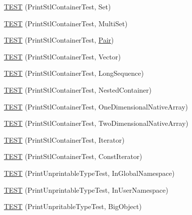 \begin{DoxyCompactItemize}
\item 
\hyperlink{namespacetesting_1_1gtest__printers__test_abdc498462741033074f8e86b7c0bd480}{T\+E\+ST} (Print\+Stl\+Container\+Test, Set)
\item 
\hyperlink{namespacetesting_1_1gtest__printers__test_adaa3e1cfa3feca377b3958edb41fc0f1}{T\+E\+ST} (Print\+Stl\+Container\+Test, Multi\+Set)
\item 
\hyperlink{namespacetesting_1_1gtest__printers__test_ad5d3e873b00c1c9e3f5924e106dd7831}{T\+E\+ST} (Print\+Stl\+Container\+Test, \hyperlink{namespacetesting_ac7520de8af26d3085513eeeb68561889}{Pair})
\item 
\hyperlink{namespacetesting_1_1gtest__printers__test_abfab1ea62f0285c0cdbcca500be0dac8}{T\+E\+ST} (Print\+Stl\+Container\+Test, Vector)
\item 
\hyperlink{namespacetesting_1_1gtest__printers__test_a55eca253f3365ad26183bcc711cb257a}{T\+E\+ST} (Print\+Stl\+Container\+Test, Long\+Sequence)
\item 
\hyperlink{namespacetesting_1_1gtest__printers__test_ad8fb463805baecdfb95154dec6ec4f27}{T\+E\+ST} (Print\+Stl\+Container\+Test, Nested\+Container)
\item 
\hyperlink{namespacetesting_1_1gtest__printers__test_a6dd59bbdea483f662fe62e2c55c106ce}{T\+E\+ST} (Print\+Stl\+Container\+Test, One\+Dimensional\+Native\+Array)
\item 
\hyperlink{namespacetesting_1_1gtest__printers__test_aca371c218e2248562ed258eaf385f4d1}{T\+E\+ST} (Print\+Stl\+Container\+Test, Two\+Dimensional\+Native\+Array)
\item 
\hyperlink{namespacetesting_1_1gtest__printers__test_a01ec32faf0032f9fbcf4895d8d6e4aa9}{T\+E\+ST} (Print\+Stl\+Container\+Test, Iterator)
\item 
\hyperlink{namespacetesting_1_1gtest__printers__test_a3b54f9a039804190b7ff2e818169c0f2}{T\+E\+ST} (Print\+Stl\+Container\+Test, Const\+Iterator)
\item 
\hyperlink{namespacetesting_1_1gtest__printers__test_a805264fd24de8e65cba977a798abc54c}{T\+E\+ST} (Print\+Unprintable\+Type\+Test, In\+Global\+Namespace)
\item 
\hyperlink{namespacetesting_1_1gtest__printers__test_a0aa1499e978bdde6c71e49ecc9db695b}{T\+E\+ST} (Print\+Unprintable\+Type\+Test, In\+User\+Namespace)
\item 
\hyperlink{namespacetesting_1_1gtest__printers__test_a6b6fba2a191094244f8aa78a4933a2c5}{T\+E\+ST} (Print\+Unpritable\+Type\+Test, Big\+Object)
\item 

\end{DoxyCompactItemize}
